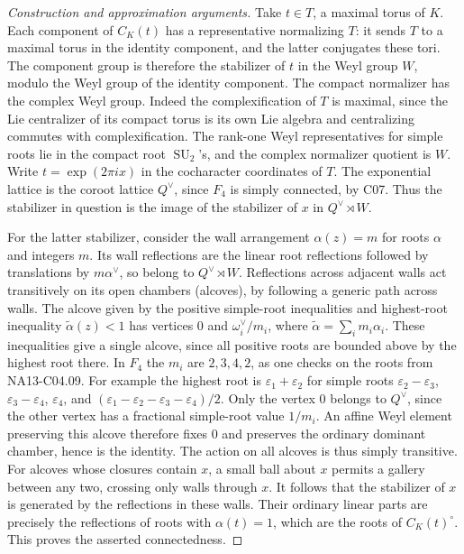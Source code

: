 \documentclass[11pt,a4paper,openany,oneside]{book}
\theoremstyle{resultstyle}
\theoremstyle{definition}
\numberwithin{equation}{chapter}
\begin{document}
\begin{proof}[Construction and approximation arguments]
Take \(t\in T\), a maximal torus of \(K\).
Each component of \(C_K(t)\) has a
representative normalizing \(T\):
it sends \(T\) to a maximal torus in
the identity component, and the latter
conjugates these tori. The component group
is therefore the stabilizer of \(t\) in
the Weyl group \(W\), modulo the Weyl
group of the identity component. The
compact normalizer has the complex Weyl
group. Indeed the complexification of
\(T\) is maximal, since the Lie
centralizer of its compact torus is its
own Lie algebra and centralizing
commutes with complexification. The
rank-one Weyl representatives
for simple roots lie in the compact
root \(\operatorname{SU}_2\)'s, and
the complex normalizer quotient is \(W\).
Write \(t=\exp(2\pi i x)\) in the
cocharacter coordinates of \(T\).
The exponential lattice is the coroot
lattice \(Q^\vee\), since \(F_4\) is
simply connected, by C07. Thus the
stabilizer in question is the image of
the stabilizer of \(x\) in
\(Q^\vee\rtimes W\).

For the latter stabilizer, consider the
wall arrangement \(\alpha(z)=m\) for
roots \(\alpha\) and integers \(m\).
Its wall reflections are the linear
root reflections followed by
translations by \(m\alpha^\vee\),
so belong to \(Q^\vee\rtimes W\).
Reflections across adjacent walls act
transitively on its open chambers (alcoves),
by following a generic path across walls.
The alcove given by the positive simple-root
inequalities and highest-root inequality
\(\widetilde\alpha(z)<1\) has vertices
\(0\) and \(\omega_i^\vee/m_i\), where
\(\widetilde\alpha=\sum_i m_i\alpha_i\).
These inequalities give a single alcove,
since all positive roots are bounded above
by the highest root there. In \(F_4\)
the \(m_i\) are \(2,3,4,2\), as one
checks on the roots from NA13-C04.09.
For example the highest root is
\(\varepsilon_1+\varepsilon_2\) for simple
roots \(\varepsilon_2-\varepsilon_3\),
\(\varepsilon_3-\varepsilon_4\),
\(\varepsilon_4\), and
\((\varepsilon_1-\varepsilon_2-\varepsilon_3-\varepsilon_4)/2\).
Only the vertex \(0\) belongs to \(Q^\vee\),
since the other vertex has a fractional
simple-root value \(1/m_i\).
An affine Weyl element preserving
this alcove therefore fixes \(0\)
and preserves the ordinary dominant
chamber, hence is the identity.
The action on all alcoves is thus
simply transitive. For alcoves whose
closures contain \(x\), a small ball
about \(x\) permits a gallery between
any two, crossing only walls through
\(x\). It follows that the stabilizer
of \(x\) is generated by the reflections
in these walls. Their ordinary linear
parts are precisely the reflections of
roots with \(\alpha(t)=1\), which
are the roots of \(C_K(t)^\circ\).
This proves the asserted connectedness.


\end{proof}
\end{document}
